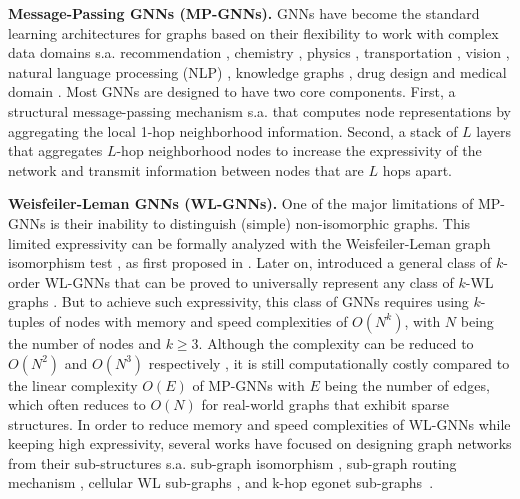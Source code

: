 \documentclass{article}
\begin{document}
{\bf Message-Passing GNNs (MP-GNNs).} GNNs have become the standard learning architectures for graphs based on their  flexibility to work with complex data domains s.a. recommendation \citep{monti2017geometric,van2018graph}, chemistry \citep{duvenaud2015convolutional,gilmer2017neural}, physics \citep{cranmer2019learning, bapst2020unveiling}, transportation \citep{derrowpinion2021traffic}, vision \citep{han2022vision}, natural language processing (NLP) \citep{wu2021graph}, knowledge graphs \citep{schlichtkrull2018modeling}, drug design \citep{stokes2020deep, gaudelet2020utilising} and medical domain \citep{li2020graph,li2021braingnn}. Most GNNs are designed to have two core components. First, a structural message-passing mechanism s.a. \citet{defferrard2016convolutional, kipf2017semi, hamilton2017inductive, monti2017geometric, bresson2017gatedgcn, gilmer2017neural, velivckovic2018graph} that computes node representations by aggregating the local 1-hop neighborhood information. Second, a stack of $L$ layers that aggregates $L$-hop neighborhood nodes to increase the expressivity of the network and transmit information between nodes that are $L$ hops apart. 


{\bf Weisfeiler-Leman GNNs (WL-GNNs).} One of the major limitations of MP-GNNs is their inability to distinguish (simple) non-isomorphic graphs. This limited expressivity can be formally analyzed with the Weisfeiler-Leman graph isomorphism test \citep{weisfeiler1968reduction}, as first proposed in \citet{xu2018how, morris2019weisfeiler}. Later on, \citet{maron2018invariant} introduced a general class of $k$-order WL-GNNs that can be proved to universally represent any class of $k$-WL graphs \citep{maron2019provably, chen2019equivalence}. But to achieve such expressivity, this class of GNNs requires using $k$-tuples of nodes with memory and speed complexities of $O(N^k)$, with $N$ being the number of nodes and $k\geq 3$. Although the complexity can be reduced to $O(N^2)$ and $O(N^3)$ respectively \citep{maron2019provably,chen2019equivalence,azizian2020expressive}, it is still computationally costly compared to the linear complexity $O(E)$ of MP-GNNs with $E$ being the number of edges, which often reduces to $O(N)$ for real-world graphs that exhibit sparse structures.
In order to reduce memory and speed complexities of WL-GNNs while keeping high expressivity, several works have focused on designing graph networks from their sub-structures s.a. sub-graph isomorphism \citep{bouritsas2022improving}, sub-graph routing mechanism \citep{alsentzer2020subgraph}, cellular WL sub-graphs \citep{bodnar2021weisfeiler}, and k-hop egonet sub-graphs~\citep{xu2018how, zhang2021nested, chen2019equivalence, zhao2021stars, sun}.
\end{document}
